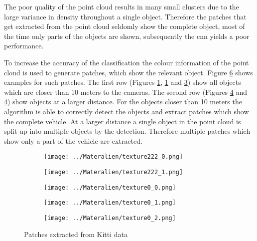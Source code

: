 The poor quality of the point cloud results in many small clusters due to the large variance in density throughout a single object. Therefore the patches that get extracted from the point cloud seldomly show the complete object, most of the time only parts of the objects are shown, subsequently the \ac{cnn} yields a poor performance.

To increase the accuracy of the classification the colour information of the point cloud is used to generate patches, which show the relevant object. Figure \ref{fig:eval:texture} shows examples for such patches.
The first row (Figures \ref{fig:eval:texture:222_0}, \ref{fig:eval:texture:222_0} and \ref{fig:eval:texture:0_0}) show all objects which are closer than 10 meters to the cameras.
The second row (Figures \ref{fig:eval:texture:0_1} and \ref{fig:eval:texture:0_1}) show objects at a larger distance.
For the objects closer than 10 meters the algorithm is able to correctly detect the objects and extract patches which show the complete vehicle. 
At a larger distance a single object in the point cloud is split up into multiple objects by the detection.
Therefore multiple patches which show only a part of the vehicle are extracted.

\begin{figure}[h!]
    \centering
    \begin{subfigure}[c]{0.3\textwidth}
        \texttt{[image: ../Materalien/texture222\_0.png]}
        \label{fig:eval:texture:222_0}
    \end{subfigure}
    \begin{subfigure}[c]{0.3\textwidth}
        \texttt{[image: ../Materalien/texture222\_1.png]}
        \label{fig:eval:texture:222_1}
    \end{subfigure}
    \begin{subfigure}[c]{0.3\textwidth}
        \texttt{[image: ../Materalien/texture0\_0.png]}
        \label{fig:eval:texture:0_0}
    \end{subfigure}
    \begin{subfigure}[c]{0.3\textwidth}
        \texttt{[image: ../Materalien/texture0\_1.png]}
        \label{fig:eval:texture:0_1}
    \end{subfigure}
    \begin{subfigure}[c]{0.3\textwidth}
        \texttt{[image: ../Materalien/texture0\_2.png]}
        \label{fig:eval:texture:0_2}
    \end{subfigure}
    \caption{Patches extracted from Kitti data}
    \label{fig:eval:texture}
\end{figure}

